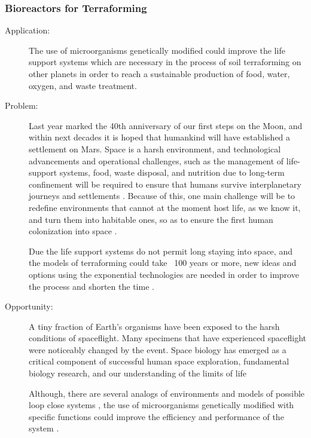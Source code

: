 \subsubsection{Bioreactors for Terraforming}
\label{bioreactors}
 
\begin{description}   \item[Application:] The use of microorganisms genetically modified  could
improve the life support systems   which are necessary in the process of
soil   terraforming on other planets in order to reach a sustainable
production  of food, water, oxygen,  and waste treatment.
 
\item[Problem:]  Last year marked  the 40th anniversary of our first steps on
the  Moon, and within next decades  it is hoped that humankind will have
established   a settlement on Mars. Space is a harsh environment, and
technological  advancements and  operational challenges, such as the
management   of life-support systems, food, waste disposal, and
nutrition  due to long-term  confinement will be required to ensure that
humans  survive interplanetary  journeys and settlements \cite{Horneck2010}. Because of   this, one main challenge will be to redefine environments that cannot at the   moment host life, as we know it, and turn them into habitable ones, so   as to ensure the first human
colonization   into space   \cite{gerlach}.
 
Due  the life support systems do  not permit long staying into space,
and  the  models of terraforming could take ~100 years or more, new
ideas  and options using the  exponential technologies are needed in
order   to improve the process and shorten the time \cite{Heppener2008}.
 
\item[Opportunity:]  A tiny  fraction of Earth’s organisms have been exposed to
the  harsh conditions of  spaceflight. Many specimens that have
experienced   spaceflight were noticeably changed by the event. Space
biology  has emerged as a critical  component of successful human space
exploration,   fundamental biology research, and our understanding of
the  limits of life \cite{Dubertret1987,Hendrickx2007}
 
Although,  there are several  analogs of environments and models of
possible   loop close systems \cite{Poughon2009}, the use of
microorganisms  genetically  modified with specific functions could
improve   the efficiency and performance of the system \cite{Kern2001}.
 

\end{description}
